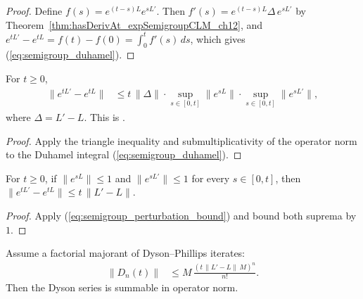 \begin{proof}
    \leanok
    Define $f(s) = e^{(t-s)L}e^{sL'}$.
    Then $f'(s) = e^{(t-s)L}\Delta\,e^{sL'}$ by
    Theorem~\ref{thm:hasDerivAt_expSemigroupCLM_ch12}, and
    $e^{tL'} - e^{tL} = f(t) - f(0) = \int_0^t f'(s)\,ds$,
    which gives (\ref{eq:semigroup_duhamel}).
\end{proof}

\begin{theorem}\label{thm:perturbation_bound_ch12}
    \leanok
    For $t \ge 0$,
    \begin{align}
        \bigl\|e^{tL'} - e^{tL}\bigr\|
        &\le t\,\|\Delta\|
        \cdot \sup_{s \in [0,t]}\|e^{sL}\|
        \cdot \sup_{s \in [0,t]}\|e^{sL'}\|,
        \label{eq:semigroup_perturbation_bound}
    \end{align}
    where $\Delta = L' - L$.
    This is \cite[Corollary~7.1]{Wolf2012Quantum}.
\end{theorem}

\begin{proof}
    \leanok
    Apply the triangle inequality and submultiplicativity of the
    operator norm to the Duhamel integral
    (\ref{eq:semigroup_duhamel}).
\end{proof}

\begin{corollary}
    \label{cor:perturbation_bound_unit_norm_ch12}
    \leanok
    For $t \ge 0$, if $\|e^{sL}\| \le 1$ and $\|e^{sL'}\| \le 1$ for every
    $s \in [0,t]$, then
    $\|e^{tL'} - e^{tL}\| \le t\,\|L' - L\|$.
\end{corollary}

\begin{proof}
    \leanok
    Apply (\ref{eq:semigroup_perturbation_bound}) and bound both suprema
    by $1$.
\end{proof}

\begin{lemma}
    \label{lem:summable_dyson_factorial_ch12}
    \leanok
    Assume a factorial majorant of Dyson--Phillips iterates:
    \begin{align}
        \|D_n(t)\|
        &\le M\,\frac{(t\,\|L'-L\|\,M)^n}{n!}.
        \label{eq:semigroup_dyson_majorant}
    \end{align}
    Then the Dyson series is summable in operator norm.
\end{lemma}

